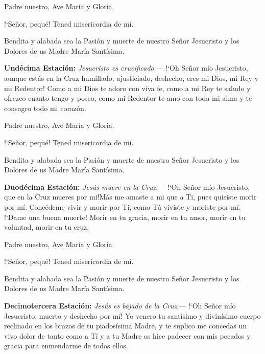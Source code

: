 \documentclass[10pt]{article}
\begin{document}
\begin{multicols}{2}
      \vspace{2mm}

      Padre nuestro, Ave María y Gloria.

      {!`}Señor, pequé! Tened misericordia de mí.

      Bendita y alabada sea la Pasión y muerte de nuestro Señor Jesucristo y los Dolores de us Madre María Santísima.

      \vspace{2mm}

      \textbf{Undécima Estación:} \textit{Jesucristo es crucificado}.--- {!`}Oh Señor mío Jesucristo, aunque estás en la Cruz humillado, ajusticiado, deshecho, eres mi Dios, mi Rey y mi Redentor!
      Como a mi Dios te adoro con viva fe, como a mi Rey te saludo y ofrezco cuanto tengo y poseo, como mi Redentor te amo con toda mi alma y te consagro todo mi corazón. 

      \vspace{2mm}

      Padre nuestro, Ave María y Gloria.

      {!`}Señor, pequé! Tened misericordia de mí.

      Bendita y alabada sea la Pasión y muerte de nuestro Señor Jesucristo y los Dolores de us Madre María Santísima.

      \vspace{2mm}

      \textbf{Duodécima Estación:} \textit{Jesús muere en la Cruz}.--- {!`}Oh Señor mío Jesucristo, que en la Cruz mueres por mi!Más me amaste a mi que a Ti, pues quisiste morir por mí.
      Concédeme vivir y morir por Ti, como Tú viviste y moriste por mí. {!`}Dame una buena muerte! Morir en tu gracia, morir en tu amor, morir en tu voluntad, morir en tu cruz.

      \vspace{2mm}

      Padre nuestro, Ave María y Gloria.

      {!`}Señor, pequé! Tened misericordia de mí.

      Bendita y alabada sea la Pasión y muerte de nuestro Señor Jesucristo y los Dolores de us Madre María Santísima.

      \vspace{2mm}

      \textbf{Decimotercera Estación:} \textit{Jesús es bajado de la Cruz}.--- {!`}Oh Señor mío Jesucristo, muerto y deshecho por mí! Yo venero tu santísimo y divinísimo cuerpo reclinado en
      los brazos de tu piadosísima Madre, y te suplico me concedas un vivo dolor de tanto como a Tí y a tu Madre os hice padecer con mis pecados y gracia para enmendarme de todos ellos.


\end{multicols}
\end{document}

